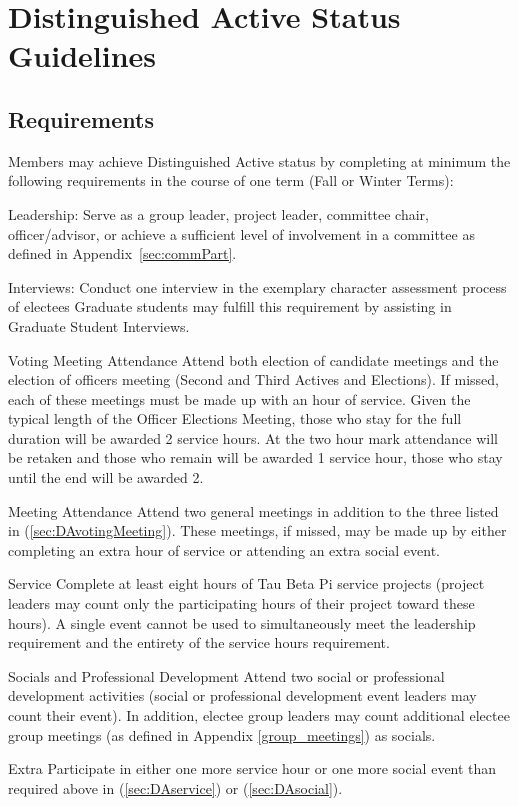 


\chapter{Distinguished Active Status Guidelines}\label{sec:DAstatus}
\section{Requirements} Members may achieve Distinguished Active status by completing at minimum the following requirements in the course of one term (Fall or Winter Terms):
\begin{enumsubsection}
\item{Leadership:} Serve as a group leader, project leader, committee chair,  officer/advisor, or achieve a sufficient level of involvement in a committee as defined in Appendix~\ref{sec:commPart}.
\item{Interviews:} Conduct one interview in the exemplary character assessment process of electees  Graduate students may fulfill this requirement by assisting in Graduate Student Interviews.
\item{Voting Meeting Attendance}\label{sec:DAvotingMeeting} Attend both election of candidate meetings and the election of officers meeting (Second and Third Actives and Elections). If missed, each of these meetings must be made up with an hour of service. Given the typical length of the Officer Elections Meeting, those who stay for the full duration will be awarded 2 service hours. At the two hour mark attendance will be retaken and those who remain will be awarded 1 service hour, those who stay until the end will be awarded 2.
\item{Meeting Attendance} Attend two general meetings in addition to the three listed in (\ref{sec:DAvotingMeeting}). These meetings, if missed, may be made up by either completing an extra hour of service or attending an extra social event.
\item{Service}\label{sec:DAservice} Complete at least eight hours of Tau Beta Pi service projects (project leaders may count only the participating hours of their project toward these hours). A single event cannot be used to simultaneously meet the leadership requirement and the entirety of the service hours requirement.
\item{Socials and Professional Development} \label{sec:DAsocial}Attend two social or professional development activities (social or professional development event leaders may count their event). In addition, electee group leaders may count additional electee group meetings (as defined in Appendix \ref{group_meetings}) as socials.
\item{Extra} Participate in either one more service hour or one more social event than required above in (\ref{sec:DAservice}) or (\ref{sec:DAsocial}).

\end{enumsubsection}
